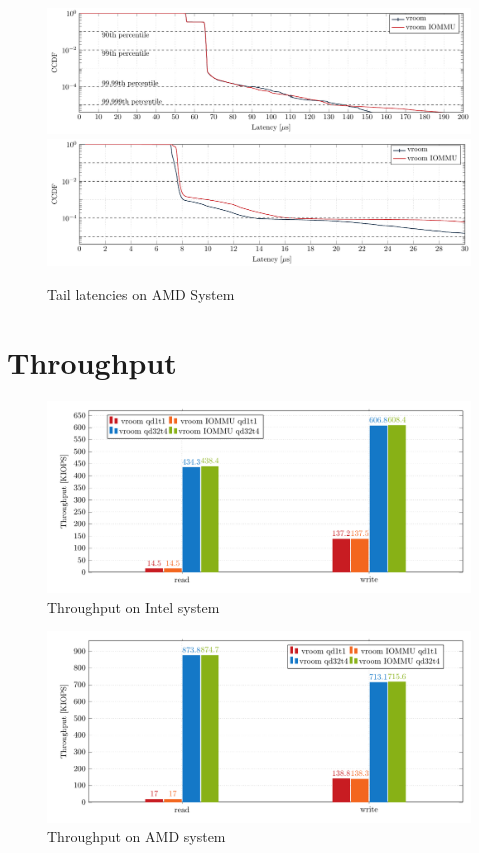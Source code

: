 \begin{figure}[H]
  \centering
   {\includegraphics[width=.99\textwidth]{figures/lats_ccdf_2MiB_qd1t1_read_epyc} \label{fig:ccdf-read-epyc}}
   {\includegraphics[width=.99\textwidth]{figures/lats_ccdf_2MiB_qd1t1_epyc} \label{fig:ccdf-write-epyc}}
  \caption{Tail latencies on AMD System}
  \label{fig:ccdf-epyc}
\end{figure}

\section{Throughput}

\begin{figure}[H]
  \centering
  \includegraphics[width=.8\textwidth]{figures/throughput_bar}
  \caption{Throughput on Intel system}
  \label{fig:throughput}
\end{figure}

\begin{figure}[H]
  \centering
  \includegraphics[width=.8\textwidth]{figures/throughput_bar_epyc}
  \caption{Throughput on AMD system}
  \label{fig:throughputepyc}
\end{figure}



